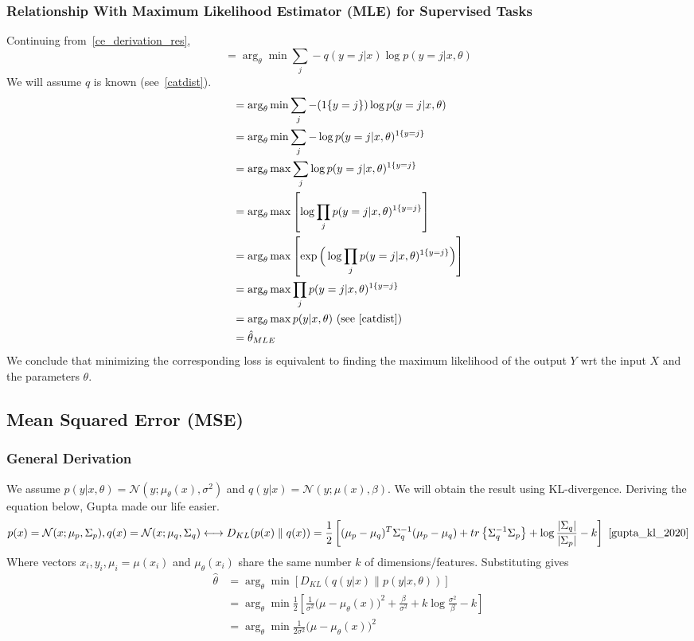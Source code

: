 \documentclass{book}
\numberwithin{equation}{subsection}
\begin{document}
\subsubsection{Relationship With Maximum Likelihood Estimator (MLE) for Supervised Tasks}
\label{mle_ce}
Continuing from~\ref{ce_derivation_res},
\begin{equation}
    = \arg_\theta \min \sum_j -q(y=j|x)\log p(y=j|x,\theta)
\end{equation}
We will assume $q$ is known (see~\ref{catdist}).
\begin{align}
    &= \arg_\theta \min \sum_j -(1\{y=j\})\log p(y=j|x,\theta)\\
    &= \arg_\theta \min \sum_j -\log p(y=j|x,\theta)^{1\{y=j\}}\\
    &= \arg_\theta \max \sum_j \log p(y=j|x,\theta)^{1\{y=j\}}\\
    &= \arg_\theta \max\left[\log\prod_j p(y=j|x,\theta)^{1\{y=j\}}\right]\\
    &= \arg_\theta \max\left[\exp\Big(\log\prod_j p(y=j|x,\theta)^{1\{y=j\}}\Big)\right]\\
    &= \arg_\theta \max\prod_j p(y=j|x,\theta)^{1\{y=j\}}\\
    &= \arg_\theta\max p(y|x,\theta) \ \text{(see~\ref{catdist})}\\
    &= \hat{\theta}_{MLE}\label{mle_ce_res}
\end{align}
We conclude that minimizing the corresponding loss is equivalent to finding the maximum likelihood of the output $Y$ wrt the input $X$ and the parameters $\theta$.
\subsection{Mean Squared Error (MSE)}
\subsubsection{General Derivation}
\label{mse_derivation}
We assume $p(y|x,\theta) = \mathcal{N}(y; \mu_\theta(x),\sigma^2)$ and $q(y|x) = \mathcal{N}(y; \mu(x),\beta)$. We will obtain the result using KL-divergence. Deriving the equation below, Gupta made our life easier.
\begin{equation}
    p(x) = \mathcal{N}(x;\mu_p,\Sigma_p), q(x) = \mathcal{N}(x;\mu_q,\Sigma_q) \longleftrightarrow D_{KL}(p(x) \parallel q(x)) = \frac{1}{2}\left[(\mu_p-\mu_q)^T\Sigma_q^{-1}(\mu_p-\mu_q) + tr\left\{\Sigma_q^{-1}\Sigma_p\right\}+\log\frac{|\Sigma_q|}{|\Sigma_p|} - k\right]~\cite{gupta_kl_2020}\label{gupta_kl}
\end{equation}
Where vectors $x_i, y_i, \mu_i=\mu(x_i)$ and $\mu_\theta(x_i)$ share the same number $k$ of dimensions/features. Substituting gives
\begin{align}
    \hat{\theta}
    &= \arg_\theta \min[D_{KL}(q(y|x) \parallel p(y|x,\theta))]\\
    &= \arg_\theta \min\frac{1}{2}\left[\frac{1}{\sigma^2}\big(\mu-\mu_\theta(x)\big)^2 + \frac{\beta}{\sigma^2}+k\log\frac{\sigma^2}{\beta} - k\right]\\
    &= \arg_\theta \min\frac{1}{2\sigma^2}\big(\mu-\mu_\theta(x)\big)^2\label{mse_derivation_res2}
\end{align}
\end{document}
